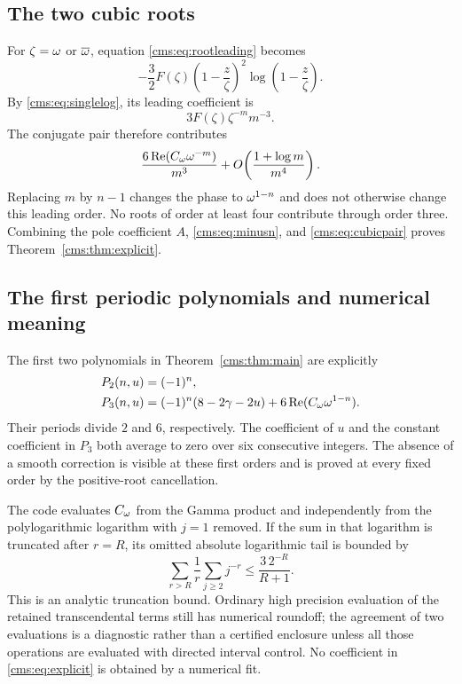 \subsection{The two cubic roots}
For $\zeta=\omega$ or $\overline{\omega}$, equation \eqref{cms:eq:rootleading} becomes
\[
-\frac32F(\zeta)\left(1-\frac z\zeta\right)^2
\log\left(1-\frac z\zeta\right).
\]
By \eqref{cms:eq:singlelog}, its leading coefficient is
\[
3F(\zeta)\zeta^{-m}m^{-3}.
\]
The conjugate pair therefore contributes
\begin{equation}\label{cms:eq:cubicpair}
\frac{6\operatorname{Re}(C_\omega\omega^{-m})}{m^3}
+O\!\left(\frac{1+\log m}{m^4}\right).
\end{equation}
Replacing $m$ by $n-1$ changes the phase to $\omega^{1-n}$ and does not otherwise change this leading order. No roots of order at least four contribute through order three. Combining the pole coefficient $A$, \eqref{cms:eq:minusn}, and \eqref{cms:eq:cubicpair} proves Theorem~\ref{cms:thm:explicit}.

\subsection{The first periodic polynomials and numerical meaning}
The first two polynomials in Theorem~\ref{cms:thm:main} are explicitly
\begin{align*}
P_2(n,u)&=(-1)^n,\\
P_3(n,u)&=(-1)^n(8-2\gamma-2u)
 +6\operatorname{Re}(C_\omega\omega^{1-n}).
\end{align*}
Their periods divide $2$ and $6$, respectively. The coefficient of $u$ and the constant coefficient in $P_3$ both average to zero over six consecutive integers. The absence of a smooth correction is visible at these first orders and is proved at every fixed order by the positive-root cancellation.

The code evaluates $C_\omega$ from the Gamma product and independently from the polylogarithmic logarithm with $j=1$ removed. If the sum in that logarithm is truncated after $r=R$, its omitted absolute logarithmic tail is bounded by
\begin{equation}\label{cms:eq:numericaltail}
\sum_{r>R}\frac1r\sum_{j\geq2}j^{-r}
\leq\frac{3\,2^{-R}}{R+1}.
\end{equation}
This is an analytic truncation bound. Ordinary high precision evaluation of the retained transcendental terms still has numerical roundoff; the agreement of two evaluations is a diagnostic rather than a certified enclosure unless all those operations are evaluated with directed interval control. No coefficient in \eqref{cms:eq:explicit} is obtained by a numerical fit.
